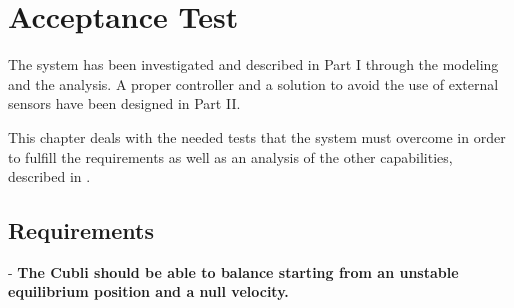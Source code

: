 \chapter{Acceptance Test}

The system has been investigated and described in Part I through the modeling and the analysis. A proper controller and a solution to avoid the use of external sensors have been designed in Part II.

This chapter deals with the needed tests that the system must overcome in order to fulfill the requirements as well as an analysis of the other capabilities, described in .

\section{Requirements}

- \textbf{The Cubli should be able to balance starting from an unstable equilibrium position and a null velocity.}

